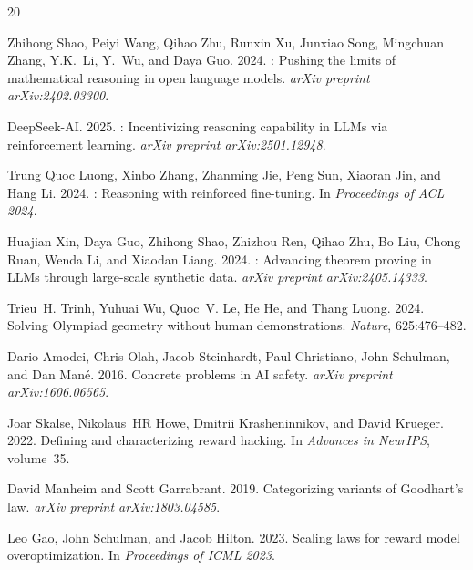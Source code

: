 \documentclass[11pt]{article}
\begin{document}
\begin{thebibliography}{20}

Zhihong Shao, Peiyi Wang, Qihao Zhu, Runxin Xu, Junxiao Song, Mingchuan Zhang, Y.K.~Li, Y.~Wu, and Daya Guo. 2024.
: Pushing the limits of mathematical reasoning in open language models.
\newblock \emph{arXiv preprint arXiv:2402.03300}.

DeepSeek-AI. 2025.
: Incentivizing reasoning capability in {LLMs} via reinforcement learning.
\newblock \emph{arXiv preprint arXiv:2501.12948}.

Trung Quoc Luong, Xinbo Zhang, Zhanming Jie, Peng Sun, Xiaoran Jin, and Hang Li. 2024.
: Reasoning with reinforced fine-tuning.
\newblock In \emph{Proceedings of ACL 2024}.

Huajian Xin, Daya Guo, Zhihong Shao, Zhizhou Ren, Qihao Zhu, Bo Liu, Chong Ruan, Wenda Li, and Xiaodan Liang. 2024.
: Advancing theorem proving in {LLMs} through large-scale synthetic data.
\newblock \emph{arXiv preprint arXiv:2405.14333}.

Trieu~H. Trinh, Yuhuai Wu, Quoc~V. Le, He He, and Thang Luong. 2024.
\newblock Solving {Olympiad} geometry without human demonstrations.
\newblock \emph{Nature}, 625:476--482.

Dario Amodei, Chris Olah, Jacob Steinhardt, Paul Christiano, John Schulman, and Dan Man\'{e}. 2016.
\newblock Concrete problems in {AI} safety.
\newblock \emph{arXiv preprint arXiv:1606.06565}.

Joar Skalse, Nikolaus~HR Howe, Dmitrii Krasheninnikov, and David Krueger. 2022.
\newblock Defining and characterizing reward hacking.
\newblock In \emph{Advances in NeurIPS}, volume~35.

David Manheim and Scott Garrabrant. 2019.
\newblock Categorizing variants of {Goodhart's} law.
\newblock \emph{arXiv preprint arXiv:1803.04585}.

Leo Gao, John Schulman, and Jacob Hilton. 2023.
\newblock Scaling laws for reward model overoptimization.
\newblock In \emph{Proceedings of ICML 2023}.


\end{thebibliography}
\end{document}
